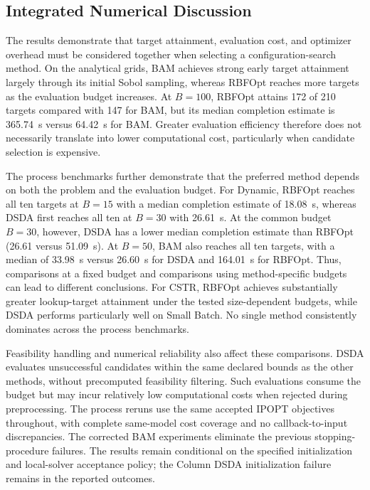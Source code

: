 \documentclass{article}
\begin{document}
\subsection{Integrated Numerical Discussion}
\label{sec:cross-benchmark}
The results demonstrate that target attainment, evaluation cost, and optimizer overhead must be considered together when selecting a configuration-search method. 
On the analytical grids, BAM achieves strong early target attainment largely through its initial Sobol sampling, whereas RBFOpt reaches more targets as the evaluation budget increases. 
At $B=100$, RBFOpt attains 172 of 210 targets compared with 147 for BAM, but its median completion estimate is 365.74~s versus 64.42~s for BAM. 
Greater evaluation efficiency therefore does not necessarily translate into lower computational cost, particularly when candidate selection is expensive.

The process benchmarks further demonstrate that the preferred method depends on both the problem and the evaluation budget.
For Dynamic, RBFOpt reaches all ten targets at $B=15$ with a median completion estimate of 18.08~s, whereas DSDA first reaches all ten at $B=30$ with 26.61~s. 
At the common budget $B=30$, however, DSDA has a lower median completion estimate than RBFOpt (26.61 versus 51.09~s). At $B=50$, BAM also reaches all ten targets, with a median of 33.98~s versus 26.60~s for DSDA and 164.01~s for RBFOpt. 
Thus, comparisons at a fixed budget and comparisons using method-specific budgets can lead to different conclusions. 
For CSTR, RBFOpt achieves substantially greater lookup-target attainment under the tested size-dependent budgets, while DSDA performs particularly well on Small Batch. 
No single method consistently dominates across the process benchmarks.

Feasibility handling and numerical reliability also affect these comparisons. 
DSDA evaluates unsuccessful candidates within the same declared bounds as the other methods, without precomputed feasibility filtering. 
Such evaluations consume the budget but may incur relatively low computational costs when rejected during preprocessing. 
The process reruns use the same accepted IPOPT objectives throughout, with complete same-model cost coverage and no callback-to-input discrepancies. 
The corrected BAM experiments eliminate the previous stopping-procedure failures. The results remain conditional on the specified initialization and local-solver acceptance policy; the Column DSDA initialization failure remains in the reported outcomes.
\end{document}
